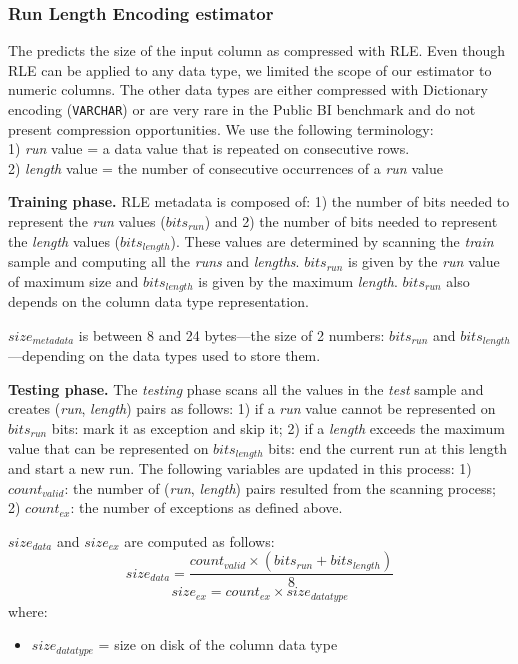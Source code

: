 
\subsubsection{Run Length Encoding estimator}
\label{subsub:estimator:rle}

The  predicts the size of the input column as compressed with RLE. Even though RLE can be applied to any data type, we limited the scope of our estimator to numeric columns. The other data types are either compressed with Dictionary encoding (\verb|VARCHAR|) or are very rare in the Public BI benchmark and do not present compression opportunities. We use the following terminology:\\
1) \textit{run} value = a data value that is repeated on consecutive rows.\\
2) \textit{length} value = the number of consecutive occurrences of a \textit{run} value

\textbf{Training phase.} RLE metadata is composed of: 1) the number of bits needed to represent the \textit{run} values (\(bits_{run}\)) and 2) the number of bits needed to represent the \textit{length} values (\(bits_{length}\)). These values are determined by scanning the \textit{train} sample and computing all the \textit{runs} and \textit{lengths}. \(bits_{run}\) is given by the \textit{run} value of maximum size and \(bits_{length}\) is given by the maximum \textit{length}. \(bits_{run}\) also depends on the column data type representation.

\(size_{metadata}\) is between 8 and 24 bytes---the size of 2 numbers: \(bits_{run}\) and \(bits_{length}\)---depending on the data types used to store them.

\textbf{Testing phase.} The \textit{testing} phase scans all the values in the \textit{test} sample and creates (\textit{run}, \textit{length}) pairs as follows: 1) if a \textit{run} value cannot be represented on \(bits_{run}\) bits: mark it as exception and skip it; 2) if a \textit{length} exceeds the maximum value that can be represented on \(bits_{length}\) bits: end the current run at this length and start a new run. The following variables are updated in this process: 1) \(count_{valid}\): the number of (\textit{run}, \textit{length}) pairs resulted from the scanning process; 2) \(count_{ex}\): the number of exceptions as defined above.

\(size_{data}\) and \(size_{ex}\) are computed as follows:
\begin{equation}
\label{eq:estimators:rle:sizedata}
size_{data} = \frac{count_{valid} \times (bits_{run} + bits_{length})}{8}
\end{equation}
\begin{equation}
\label{eq:estimators:rle:sizeex}
size_{ex} = count_{ex} \times size_{datatype}
\end{equation}
where:
\begin{itemize}
    \item[] \(size_{datatype}\) = size on disk of the column data type
\end{itemize}

